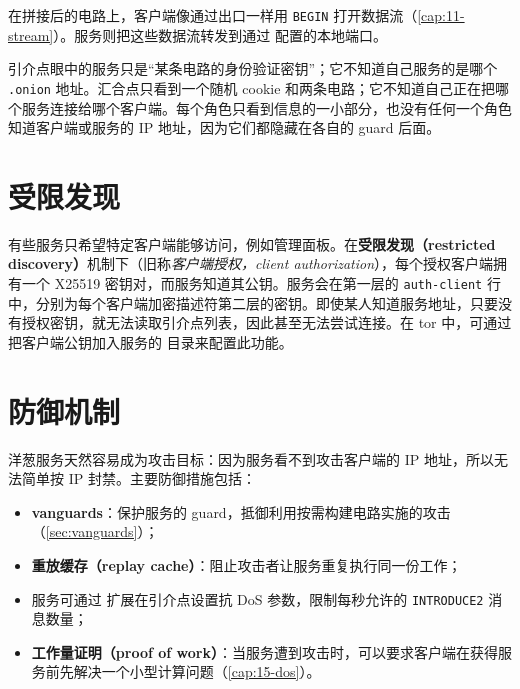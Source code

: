在拼接后的电路上，客户端像通过出口一样用 \texttt{BEGIN} 打开数据流（\cref{cap:11-stream}）。服务则把这些数据流转发到通过  配置的本地端口。

\begin{approfondimento}[为什么需要这么多中继？]
引介点眼中的服务只是“某条电路的身份验证密钥”；它不知道自己服务的是哪个 \texttt{.onion} 地址。汇合点只看到一个随机 cookie 和两条电路；它不知道自己正在把哪个服务连接给哪个客户端。每个角色只看到信息的一小部分，也没有任何一个角色知道客户端或服务的 IP 地址，因为它们都隐藏在各自的 guard 后面。
\end{approfondimento}

\section{受限发现}\label{sec:os-ristretta}

有些服务只希望特定客户端能够访问，例如管理面板。在\textbf{受限发现（restricted discovery）}机制下（旧称\emph{客户端授权，client authorization}），每个授权客户端拥有一个 X25519 密钥对，而服务知道其公钥。服务会在第一层的 \texttt{auth-client} 行中，分别为每个客户端加密描述符第二层的密钥。即使某人知道服务地址，只要没有授权密钥，就无法读取引介点列表，因此甚至无法尝试连接。在 tor 中，可通过把客户端公钥加入服务的  目录来配置此功能。

\section{防御机制}\label{sec:os-difese}

洋葱服务天然容易成为攻击目标：因为服务看不到攻击客户端的 IP 地址，所以无法简单按 IP 封禁。主要防御措施包括：
\begin{itemize}
  \item \textbf{vanguards}：保护服务的 guard，抵御利用按需构建电路实施的攻击（\cref{sec:vanguards}）；
  \item \textbf{重放缓存（replay cache）}：阻止攻击者让服务重复执行同一份工作；
  \item 服务可通过  扩展在引介点设置抗 DoS 参数，限制每秒允许的 \texttt{INTRODUCE2} 消息数量；
  \item \textbf{工作量证明（proof of work）}：当服务遭到攻击时，可以要求客户端在获得服务前先解决一个小型计算问题（\cref{cap:15-dos}）。
\end{itemize}

